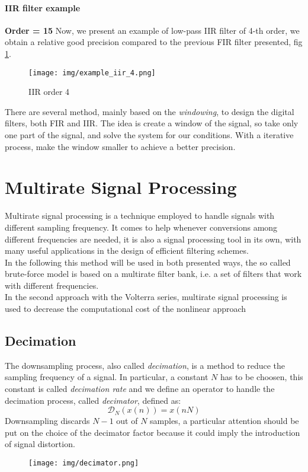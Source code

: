 \paragraph{IIR filter example}
\textbf{Order = 15} Now, we present an example of low-pass IIR filter of 4-th order, we obtain a relative good precision compared to the previous FIR filter presented, fig \ref{fig:iir_example}.
\begin{figure}[H]\centering
\texttt{[image: img/example\_iir\_4.png]} 
\caption{IIR order 4} \label{fig:iir_example}
\end{figure}
There are several method, mainly based on the \textit{windowing}, to design the digital filters, both FIR and IIR. The idea is create a window of the signal, so take only one part of the signal, and solve the system for our conditions. With a iterative process, make the window smaller to achieve a better precision.

\section{Multirate Signal Processing}
Multirate signal processing is a technique employed to handle signals with different sampling frequency. It comes to help whenever conversions among different frequencies are needed, it is also a signal processing tool in its own, with many useful applications in the design of efficient filtering schemes.\\
In the following this method will be used in both presented ways, the so called brute-force model is based on a multirate filter bank, i.e. a set of filters that work with different frequencies. \\
In the second approach with the Volterra series, multirate signal processing is used to decrease the computational cost of the nonlinear approach\\
\subsection{Decimation}
The downsampling process, also called \textit{decimation}, is a method to reduce the sampling frequency of a signal. In particular, a constant $N$ has to be choosen, this constant is called \textit{decimation rate} and we define an operator to handle the decimation process, called \textit{decimator}, defined as:
\[ \mathcal{D}_N(x(n)) = x(nN) \]
Downsampling discards $N-1$ out of $N$ samples, a particular attention should be put on the choice of the decimator factor because it could imply the introduction of signal distortion.
\begin{figure}[H]\centering
\texttt{[image: img/decimator.png]} 
\end{figure}
